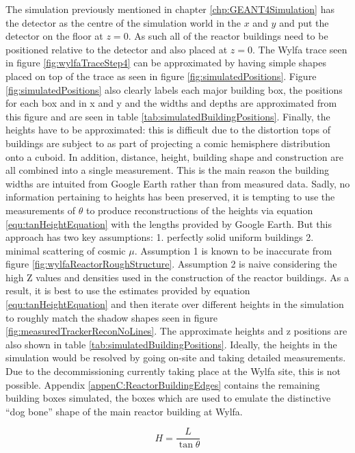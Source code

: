 The simulation previously mentioned in chapter \ref{chp:GEANT4Simulation} has the detector as the centre of the simulation world in the $x$ and $y$ and put the detector on the floor at  $z = 0 $. As such all of the reactor buildings need to be positioned relative to the detector and also placed at $z = 0$. The Wylfa trace seen in figure \ref{fig:wylfaTraceStep4} can be approximated by having simple shapes placed on top of the trace as seen in figure \ref{fig:simulatedPositions}. Figure \ref{fig:simulatedPositions} also clearly labels each major building box, the positions for each box and in x and y and the widths and depths are approximated from this figure and are seen in table \ref{tab:simulatedBuildingPositions}. Finally, the heights have to be approximated: this is difficult due to the distortion tops of buildings are subject to as part of projecting a comic hemisphere distribution onto a cuboid. In addition, distance, height, building shape and construction are all combined into a single measurement. This is the main reason the building widths are intuited from Google Earth rather than from measured data. Sadly, no information pertaining to heights has been preserved, it is tempting to use the measurements of $\theta$ to produce reconstructions of the heights via equation \ref{equ:tanHeightEquation} with the lengths provided by Google Earth. But this approach has two key assumptions: 1. perfectly solid uniform buildings 2. minimal scattering of cosmic $\mu$. Assumption 1 is known to be inaccurate from figure \ref{fig:wylfaReactorRoughStructure}. Assumption 2 is naive considering the high Z values and densities used in the construction of the reactor buildings. As a result, it is best to use the estimates provided by equation \ref{equ:tanHeightEquation} and then iterate over different heights in the simulation to roughly match the shadow shapes seen in figure \ref{fig:measuredTrackerReconNoLines}. The approximate heights and z positions are also shown in table \ref{tab:simulatedBuildingPositions}. Ideally, the heights in the simulation would be resolved by going on-site and taking detailed measurements. Due to the decommissioning currently taking place at the Wylfa site, this is not possible. Appendix \ref{appenC:ReactorBuildingEdges} contains the remaining building boxes simulated, the boxes which are used to emulate the distinctive ``dog bone'' shape of the main reactor building at Wylfa.

\begin{equation}
H = \frac{L}{\tan{\theta}}
\label{equ:tanHeightEquation}
\end{equation}


